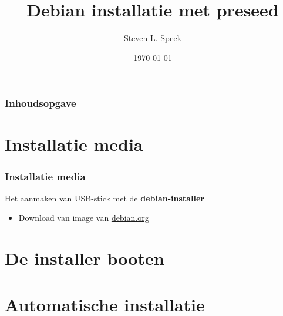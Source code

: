 \documentclass{beamer}
\title[Debian installatie] %
{Debian installatie met preseed}
\author[S.L.Speek] %
{Steven L. Speek}
\institute[ACC] %
{
  Actief Computer Centrum
}
\date[\today{}] %
{\today{}}
\begin{document}
\frame{\titlepage}


\begin{frame}
\frametitle{Inhoudsopgave}
\tableofcontents
\end{frame}


\section{Installatie media}

\begin{frame}
\frametitle{Installatie media}
Het aanmaken van USB-stick met de \textbf{debian-installer}

\begin{itemize}
    \item<1-> Download van image van \href{https://debian.org}{debian.org}
\end{itemize}
\end{frame}



\section{De installer booten}



\section{Automatische installatie}

\end{document}
